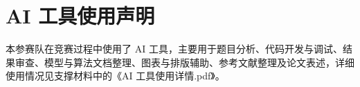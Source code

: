 \section*{AI 工具使用声明}
本参赛队在竞赛过程中使用了 AI 工具，主要用于题目分析、代码开发与调试、结果审查、模型与算法文档整理、图表与排版辅助、参考文献整理及论文表述，详细使用情况见支撑材料中的《AI 工具使用详情.pdf》。
